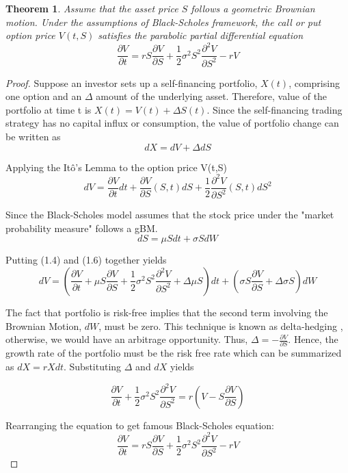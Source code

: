 \documentclass[12pt, oneside]{book}
\theoremstyle{plain}
\newtheorem{theorem}{Theorem}[section]
\theoremstyle{definition}
\begin{document}
\begin{theorem}
Assume that the asset price $S$ follows a geometric Brownian motion.  Under the assumptions of Black-Scholes framework, the call or put option price $V(t,S)$ satisfies the parabolic partial differential equation
\begin{equation}
\frac{\partial V}{\partial t} = rS\frac{\partial V}{\partial S}+\frac{1}{2} \sigma^2 S^2 \frac{\partial^2 V}{\partial S^2} - rV
\end{equation}
\end{theorem}

\begin{proof}
Suppose an investor sets up a self-financing portfolio,  $ X(t)$, comprising one option and an $\Delta$ amount of the underlying asset. Therefore, value of the portfolio at time t is $X(t) = V(t) + \Delta S(t)$. 
Since the self-financing trading strategy has no capital influx or consumption, the value of portfolio change can be written as 
\begin{equation}
dX = dV + \Delta dS
\end{equation}

Applying the It\^{o}'s Lemma to the option price V(t,S)
\begin{equation}
dV = \frac{\partial V}{\partial t} dt + \frac{\partial V}{\partial S} (S,t) dS + \frac{1}{2}\frac{\partial^2 V}{\partial S^2}(S,t)dS^2
\end{equation}

Since the Black-Scholes model assumes that the stock price under the "market probability measure" follows a gBM. 
\begin{equation}
dS = \mu S dt + \sigma S dW
\end{equation}

Putting (1.4) and (1.6) together yields
\begin{equation}
dV = (\frac{\partial V}{\partial t} + \mu S \frac{\partial V}{\partial S} + \frac{1}{2} \sigma^2 S^2 \frac{\partial^2 V}{\partial S^2} + \Delta \mu S) dt + (\sigma S \frac{\partial V}{\partial S}+\Delta \sigma S) dW
\end{equation}

The fact that portfolio is risk-free implies that the second term involving the Brownian Motion, $dW$, must be zero.  This technique is known as delta-hedging , otherwise, we would have an arbitrage opportunity. Thus, $ \Delta = - \frac{\partial V}{\partial S}$.  Hence, the growth rate of the portfolio must be the risk free rate which can be summarized as $ dX = r X dt $. Substituting $\Delta$ and $dX$ yields

\begin{equation}
\frac{\partial V}{\partial t} + \frac{1}{2} \sigma^2 S^2 \frac{\partial^2 V}{\partial S^2} = r(V-S\frac{\partial V}{\partial S})
\end{equation}

Rearranging the equation to get famous Black-Scholes equation:
\begin{equation}
\frac{\partial V}{\partial t} = rS\frac{\partial V}{\partial S}+\frac{1}{2} \sigma^2 S^2 \frac{\partial^2 V}{\partial S^2} - rV
\end{equation}
\end{proof} 
\end{document}
